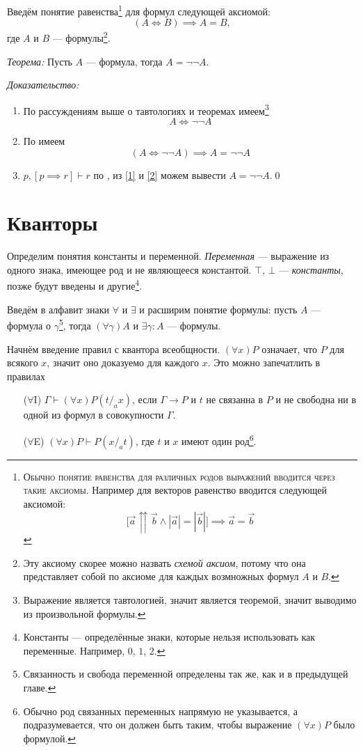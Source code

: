 Введём понятие равенства\footnote{
	\textsc{Обычно понятие равенства для различных родов выражений
		вводится через такие аксиомы.}
	Например для векторов равенство вводится следующей аксиомой:
	\[
		\big[\vec{a}\upuparrows\vec{b}\land|\vec{a}|=|\vec{b}|\big]
		\implies \vec{a}=\vec{b}
	\]
} для формул следующей аксиомой:
\[
	(A\iff B)\implies A=B,
\]
где $A$ и $B$ --- формулы\footnote{
Эту аксиому скорее можно назвать {\it схемой аксиом}, потому что она представляет
собой по аксиоме для каждых возмножных формул $A$ и $B$.
}.

{\it Теорема:} Пусть $A$ --- формула, тогда $A=\lnot\lnot A$.

	{\it Доказательство:}
\begin{enumerate}[label=(\arabic*)]
	\item{}\label{1}По рассуждениям выше о тавтологиях и теоремах
	имеем\footnote{Выражение является тавтологией, значит является теоремой,
		значит выводимо из произвольной формулы.}
	\[
		A\iff\lnot\lnot A
	\]

	\item{}\label{2}По \axiom{} имеем
	\[
		(A\iff \lnot\lnot A)\implies A=\lnot\lnot A
	\]
	\item{}\label{3}${p,[p\implies r]\vdash r}$ по \taut{},
	из \ref{1} и \ref{2}
	можем вывести $A=\lnot\lnot A$.\qed
\end{enumerate}


\section{Кванторы}

\newcommand\Aii{$\forall$I}
\newcommand\Aee{$\forall$E}
\newcommand\Eii{$\exists$I}
\newcommand\Eee{$\exists$E}

Определим понятия константы и переменной. {\it Переменная} --- выражение из одного
знака, имеющее род и не являющееся константой. $\top$, $\bot$ --- {\it константы},
позже будут введены и другие\footnote{
	Константы --- определённые знаки, которые нельзя использовать как переменные.
	Например, $0$, $1$, $2$.
}.

Введём в алфавит знаки $\forall$ и $\exists$ и расширим понятие формулы:
пусть $A$ --- формула о $\gamma$\footnote{
	Связанность и свобода переменной определены так же, как и в предыдущей главе.
},
тогда $(\forall\gamma)A$ и $\exists\gamma:A$ --- формулы.

Начнём введение правил с квантора всеобщности. $(\forall x)P$ означает, что $P$ для
всякого $x$, значит оно доказуемо для каждого $x$. Это можно запечатлить
в правилах
\begin{enumerate}
	\item[(\Aii{})]{}$\Gamma\vdash(\forall x)P(t/_{a}x)$, если $\Gamma\to P$ и $t$
	не связанна в $P$ и
	не свободна ни в одной из формул в совокупности $\Gamma$.

	\item[(\Aee{})]{}$(\forall x)P\vdash P(x/_{a}t)$, где $t$ и $x$
	имеют один род\footnote{
		Обычно род связанных переменных напрямую не указывается, а подразумевается,
		что он должен быть таким, чтобы выражение $(\forall x)P$ было формулой.
	}.
\end{enumerate}

